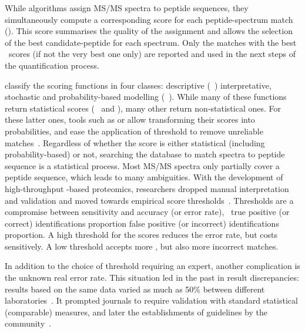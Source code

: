 
While algorithms assign \gls{MS/MS} spectra to peptide sequences,
they simultaneously compute a corresponding score
for each peptide-spectrum match (\psm).
This score summarises the quality of the assignment
and allows the selection of the best candidate-peptide for each spectrum.
Only the matches with the best \psm\ scores (if not the very best one only)
are reported and used in the next steps of the quantification process.

\citet{Sadygov2004-nl} classify the scoring functions in four classes:
descriptive (\eg\ )
interpretative, stochastic and probability-based modelling (\eg\ ).
While many of these functions return statistical scores
(\eg\  and ),
many other return non-statistical ones.
For these latter ones,
tools such as 
or 
allow transforming their scores into probabilities,
and ease the application of threshold to remove unreliable matches~.
Regardless of whether the score is either statistical (including probability-based) or not,
searching the database to match spectra to peptide sequence is a statistical process.
Most \gls{MS/MS} spectra only partially cover a peptide sequence,
which leads to many ambiguities.
With the development of high-throughput \ms-based proteomics,
researchers dropped manual interpretation and validation
and moved towards empirical score thresholds~.
Thresholds are a compromise between sensitivity and accuracy (or error rate),
\ie\ true positive (or correct) identifications proportion
 false positive (or incorrect) identifications proportion.
A high threshold for the scores reduces the error rate, but costs sensitively.
A low threshold accepts more \psms, but also more incorrect matches.

In addition to the choice of threshold requiring an expert,
another complication is the unknown real error rate.
This situation led in the past in result discrepancies:
results based on the same data varied
as much as 50\% between different laboratories~.
It prompted journals to require validation
with standard statistical (comparable) measures,
and later the establishments of guidelines by the
community~.

